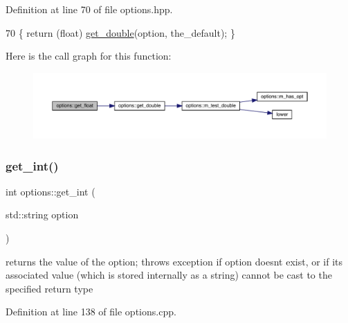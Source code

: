 Definition at line 70 of file options.\+hpp.


\begin{DoxyCode}
70 \{ \textcolor{keywordflow}{return} (\textcolor{keywordtype}{float}) \hyperlink{classoptions_a0e8ff0d44b9192754451f9dcd47cd559}{get\_double}(option, the\_default); \}
\end{DoxyCode}
Here is the call graph for this function\+:\nopagebreak
\begin{figure}[H]
\begin{center}
\leavevmode
\includegraphics[width=350pt]{classoptions_a113445829763eaa7b86cdc40c2d66e25_cgraph}
\end{center}
\end{figure}
\mbox{\label{classoptions_a797bc1915004bdbc34c5eea3fe488952}} 
\subsubsection{\texorpdfstring{get\+\_\+int()}{get\_int()}\hspace{0.1cm}{\footnotesize\ttfamily [1/2]}}
{\footnotesize\ttfamily int options\+::get\+\_\+int (\begin{DoxyParamCaption}\item[{std\+::string}]{option }\end{DoxyParamCaption})}

returns the value of the option; throws exception if option doesn\textquotesingle{}t exist, or if it\textquotesingle{}s associated value (which is stored internally as a string) cannot be cast to the specified return type 

Definition at line 138 of file options.\+cpp.


